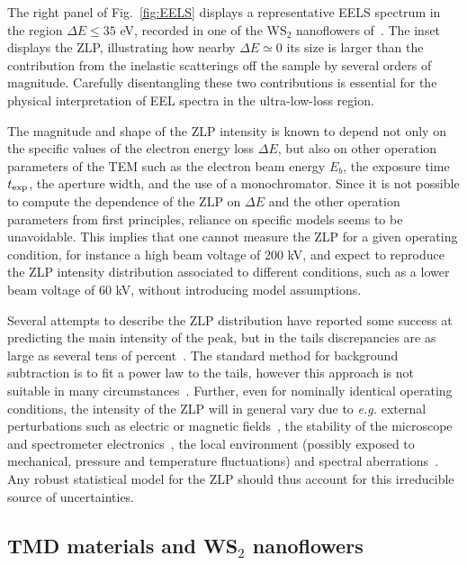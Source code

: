 The right panel of Fig.~\ref{fig:EELS} displays
a representative EELS spectrum in the region $\Delta E \le 35$ eV, recorded
in one of the WS$_2$ nanoflowers of~\cite{SabryaWS2}.
%
The inset displays the ZLP, illustrating how nearby $\Delta E\simeq 0$
its size is larger than the contribution from the inelastic scatterings
off the sample by several orders of magnitude.
%
Carefully disentangling these two contributions 
is essential for the physical interpretation of EEL spectra in the ultra-low-loss region.

The magnitude and shape of the ZLP intensity is known to depend not only on the specific values
of the electron energy loss $\Delta E$, but also on other operation parameters
of the TEM such as the electron beam energy $E_{b}$, the exposure time
$t_{\rm exp}$, the aperture width, and the use of a monochromator.
%
Since it is not possible to compute the dependence of the ZLP on $\Delta E$
and the other operation parameters from first principles,
reliance on specific models seems to be unavoidable.
%
This implies that one cannot measure the ZLP for a given operating
condition, for instance a high beam voltage of 200 kV, and expect to reproduce
the ZLP intensity distribution
associated to different conditions, such as a lower beam voltage of 60 kV,
without introducing model assumptions.

Several attempts to describe the ZLP distribution have reported
some success at predicting the main intensity of the peak, 
but in the tails discrepancies are as large as several tens of percent~\cite{Bangert:2003}.
%
The standard method for background subtraction
is to fit a power law to the tails, however this approach is not suitable in
many circumstances~\cite{Hachtel:2018, Tenailleau:1992, Reed:2002, Bosman:2006}.
%
Further, even for nominally identical operating conditions, the intensity of the ZLP
will in general vary due to {\it e.g.} external perturbations such as electric or magnetic fields~\cite{Rafferty:2000},
the stability of the microscope and spectrometer electronics~\cite{Kothleitner:2003}, the local
environment (possibly exposed to mechanical, pressure and temperature fluctuations) 
and spectral aberrations~\cite{Egerton:1996}. 
%
Any robust statistical model for the ZLP should thus account for this irreducible source of uncertainties.

\subsection{TMD materials and WS$_2$ nanoflowers}
\label{sec:tmd}

